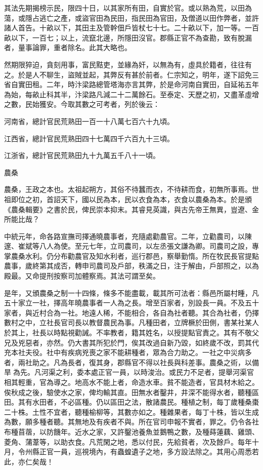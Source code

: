 \begin{pinyinscope}
 其法先期揭榜示民，限四十日，以其家所有田，自實於官。或以熟為荒，以田為蕩，或隱占逃亡之產，或盜官田為民田，指民田為官田，及僧道以田作弊者，並許諸人首告。十畝以下，其田主及管幹佃戶皆杖七十七。二十畝以下，加一等。一百畝以下，一百七；以上，流竄北邊，所隱田沒官。郡縣正官不為查勘，致有脫漏者，量事論罪，重者除名。此其大略也。



 然期限猝迫，貪刻用事，富民黠吏，並緣為奸，以無為有，虛具於籍者，往往有之。於是人不聊生，盜賊並起，其弊反有甚於前者。仁宗知之，明年，遂下詔免三省自實田租。二年，時汴梁路總管塔海亦言其弊，於是命河南自實田，自延祐五年為始，每畝止科其半，汴梁路凡減二十二萬餘石。至泰定、天歷之初，又盡革虛增之數，民始獲安。今取其數之可考者，列於後云：



 河南省，總計官民荒熟田一百一十八萬七百六十九頃。



 江西省，總計官民荒熟田四十七萬四千六百九十三頃。



 江浙省，總計官民荒熟田九十九萬五千八十一頃。



 農桑



 農桑，王政之本也。太祖起朔方，其俗不待蠶而衣，不待耕而食，初無所事焉。世祖即位之初，首詔天下，國以民為本，民以衣食為本，衣食以農桑為本。於是頒《農桑輯要》之書於民，俾民崇本抑末。其睿見英識，與古先帝王無異，豈遼、金所能比哉？



 中統元年，命各路宣撫司擇通曉農事者，充隨處勸農官。二年，立勸農司，以陳邃、崔斌等八人為使。至元七年，立司農司，以左丞張文謙為卿。司農司之設，專掌農桑水利。仍分布勸農官及知水利者，巡行郡邑，察舉勤惰。所在牧民長官提點農事，歲終第其成否，轉申司農司及戶部，秩滿之日，注于解由，戶部照之，以為殿最。又命提刑按察司加體察焉。其法可謂至矣。



 是年，又頒農桑之制一十四條，條多不能盡載，載其所可法者：縣邑所屬村畽，凡五十家立一社，擇高年曉農事者一人為之長。增至百家者，別設長一員。不及五十家者，與近村合為一社。地遠人稀，不能相合，各自為社者聽。其合為社者，仍擇數村之中，立社長官司長以教督農民為事。凡種田者，立牌橛於田側，書某社某人於其上，社長以時點視勸誡。不率教者，籍其姓名，以授提點官責之。其有不敬父兄及兇惡者，亦然。仍大書其所犯於門，俟其改過自新乃毀，如終歲不改，罰其代充本社夫役。社中有疾病兇喪之家不能耕種者，眾為合力助之。一社之中災病多者，兩社助之。凡為長者，復其身，郡縣官不得以社長與科差事。農桑之術，以備旱為先。凡河渠之利，委本處正官一員，以時浚治。或民力不足者，提舉河渠官相其輕重，官為導之。地高水不能上者，命造水車。貧不能造者，官具材木給之。俟秋成之後，驗使水之家，俾均輸其直。田無水者鑿井，井深不能得水者，聽種區田。其有水田者，不必區種。仍以區田之法，散諸農民。種植之制，每丁歲種桑棗二十株。土性不宜者，聽種榆柳等，其數亦如之。種雜果者，每丁十株，皆以生成為數，願多種者聽。其無地及有疾者不與。所在官司申報不實者，罪之。仍令各社布種苜蓿，以防饑年。近水之家，又許鑿池養魚並鵝鴨之數，及種蒔蓮藕、雞頭、菱角、蒲葦等，以助衣食。凡荒閑之地，悉以付民，先給貧者，次及餘戶。每年十月，令州縣正官一員，巡視境內，有蟲蝗遺子之地，多方設法除之。其用心周悉若此，亦仁矣哉！




\end{pinyinscope}
